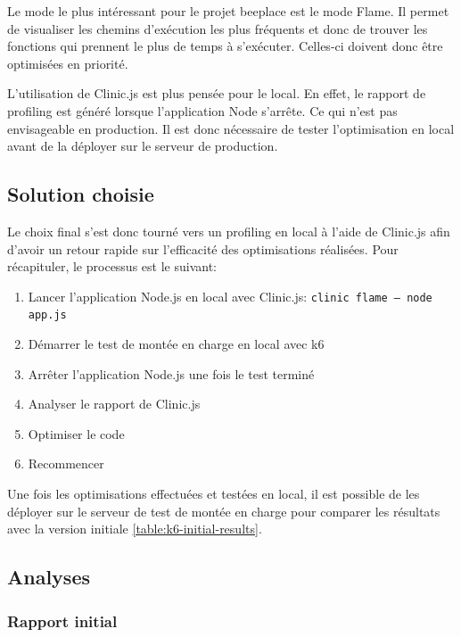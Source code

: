 Le mode le plus intéressant pour le projet \gls{beeplace} est le mode Flame. Il permet de visualiser les chemins d'exécution les plus fréquents et donc de trouver les fonctions qui prennent le plus de temps à s'exécuter. Celles-ci doivent donc être optimisées en priorité.

L'utilisation de Clinic.js est plus pensée pour le local. En effet, le rapport de profiling est généré lorsque l'application Node s'arrête. Ce qui n'est pas envisageable en production. Il est donc nécessaire de tester l'optimisation en local avant de la déployer sur le serveur de production.

\subsection{Solution choisie}

Le choix final s'est donc tourné vers un profiling en local à l'aide de Clinic.js afin d'avoir un retour rapide sur l'efficacité des optimisations réalisées. Pour récapituler, le processus est le suivant:

\begin{enumerate}
  \item Lancer l'application Node.js en local avec Clinic.js: \texttt{clinic flame -- node app.js}
  \item Démarrer le test de montée en charge en local avec k6
  \item Arrêter l'application Node.js une fois le test terminé
  \item Analyser le rapport de Clinic.js
  \item Optimiser le code
  \item Recommencer
\end{enumerate}

Une fois les optimisations effectuées et testées en local, il est possible de les déployer sur le serveur de test de montée en charge pour comparer les résultats avec la version initiale \ref{table:k6-initial-results}.

\subsection{Analyses}

\subsubsection{Rapport initial}


